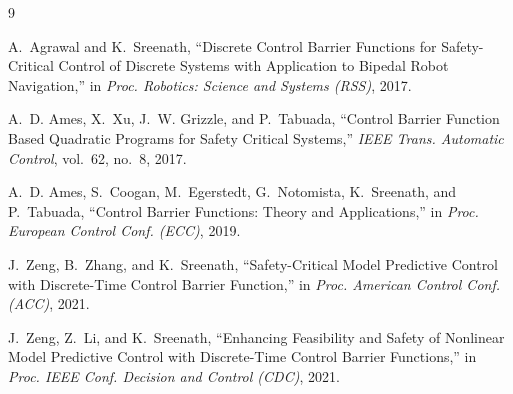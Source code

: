 \documentclass[11pt]{article}
\begin{document}
\begin{thebibliography}{9}

A.~Agrawal and K.~Sreenath, ``Discrete Control Barrier Functions for Safety-Critical Control of
Discrete Systems with Application to Bipedal Robot Navigation,'' in \emph{Proc. Robotics: Science
and Systems (RSS)}, 2017.

A.~D. Ames, X.~Xu, J.~W. Grizzle, and P.~Tabuada, ``Control Barrier Function Based Quadratic
Programs for Safety Critical Systems,'' \emph{IEEE Trans. Automatic Control}, vol.~62, no.~8, 2017.

A.~D. Ames, S.~Coogan, M.~Egerstedt, G.~Notomista, K.~Sreenath, and P.~Tabuada, ``Control Barrier
Functions: Theory and Applications,'' in \emph{Proc. European Control Conf. (ECC)}, 2019.

J.~Zeng, B.~Zhang, and K.~Sreenath, ``Safety-Critical Model Predictive Control with Discrete-Time
Control Barrier Function,'' in \emph{Proc. American Control Conf. (ACC)}, 2021.

J.~Zeng, Z.~Li, and K.~Sreenath, ``Enhancing Feasibility and Safety of Nonlinear Model Predictive
Control with Discrete-Time Control Barrier Functions,'' in \emph{Proc. IEEE Conf. Decision and
Control (CDC)}, 2021.

\end{thebibliography}
\end{document}
